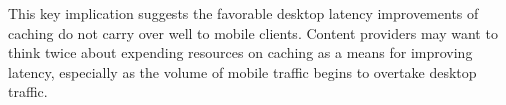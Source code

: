 This key implication suggests the favorable desktop latency improvements of caching do not carry over well to mobile clients. 
Content providers may want to think twice about expending resources on caching as a means for improving latency, especially as the volume of mobile traffic begins to overtake desktop traffic.

